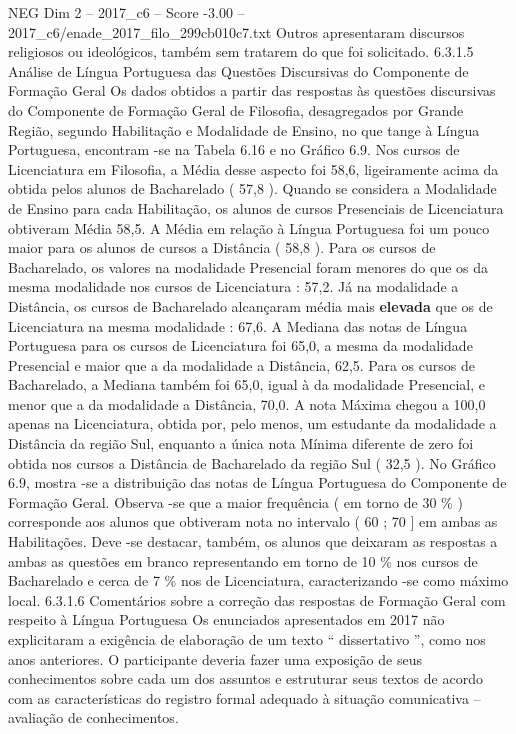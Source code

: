 \begin{textsample}{NEG Dim 2 – 2017\_c6 – Score -3.00 – 2017\_c6/enade\_2017\_filo\_299cb010c7.txt}
Outros apresentaram discursos religiosos ou ideológicos, também sem tratarem do que foi solicitado. 6.3.1.5 Análise de Língua Portuguesa das Questões Discursivas do Componente de Formação Geral Os dados obtidos a partir das respostas às questões discursivas do Componente de Formação Geral de Filosofia, desagregados por Grande Região, segundo Habilitação e Modalidade de Ensino, no que tange à Língua Portuguesa, encontram -se na Tabela 6.16 e no Gráfico 6.9.
Nos cursos de Licenciatura em Filosofia, a Média desse aspecto foi 58,6, ligeiramente acima da obtida pelos alunos de Bacharelado ( 57,8 ).
Quando se considera a Modalidade de Ensino para cada Habilitação, os alunos de cursos Presenciais de Licenciatura obtiveram Média 58,5.
A Média em relação à Língua Portuguesa foi um pouco maior para os alunos de cursos a Distância ( 58,8 ).
Para os cursos de Bacharelado, os valores na modalidade Presencial foram menores do que os da mesma modalidade nos cursos de Licenciatura : 57,2.
Já na modalidade a Distância, os cursos de Bacharelado alcançaram média mais \textbf{elevada} que os de Licenciatura na mesma modalidade : 67,6.
A Mediana das notas de Língua Portuguesa para os cursos de Licenciatura foi 65,0, a mesma da modalidade Presencial e maior que a da modalidade a Distância, 62,5.
Para os cursos de Bacharelado, a Mediana também foi 65,0, igual à da modalidade Presencial, e menor que a da modalidade a Distância, 70,0.
A nota Máxima chegou a 100,0 apenas na Licenciatura, obtida por, pelo menos, um estudante da modalidade a Distância da região Sul, enquanto a única nota Mínima diferente de zero foi obtida nos cursos a Distância de Bacharelado da região Sul ( 32,5 ).
No Gráfico 6.9, mostra -se a distribuição das notas de Língua Portuguesa do Componente de Formação Geral.
Observa -se que a maior frequência ( em torno de 30 \% ) corresponde aos alunos que obtiveram nota no intervalo ( 60 ; 70 ] em ambas as Habilitações.
Deve -se destacar, também, os alunos que deixaram as respostas a ambas as questões em branco representando em torno de 10 \% nos cursos de Bacharelado e cerca de 7 \% nos de Licenciatura, caracterizando -se como máximo local. 6.3.1.6 Comentários sobre a correção das respostas de Formação Geral com respeito à Língua Portuguesa Os enunciados apresentados em 2017 não explicitaram a exigência de elaboração de um texto “ dissertativo ”, como nos anos anteriores.
O participante deveria fazer uma exposição de seus conhecimentos sobre cada um dos assuntos e estruturar seus textos de acordo com as características do registro formal adequado à situação comunicativa – avaliação de conhecimentos.

\end{textsample}
